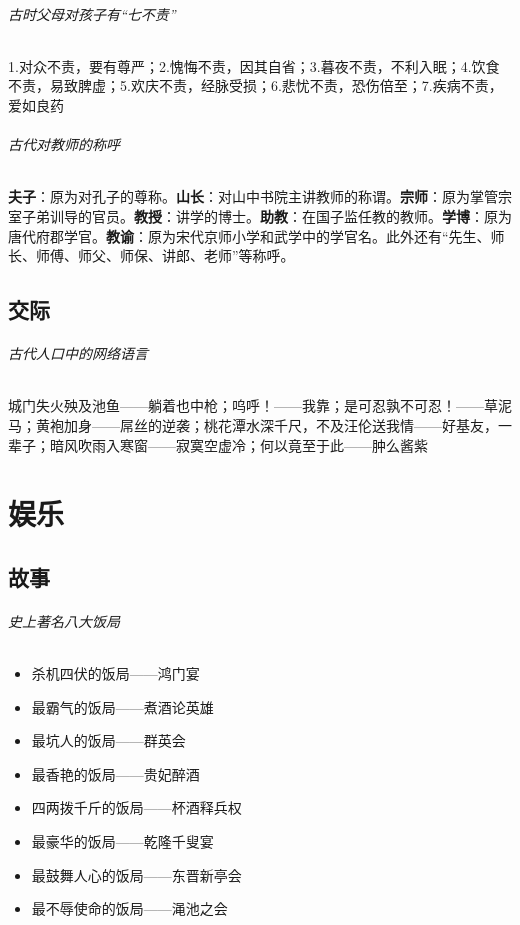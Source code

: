 \documentclass[UTF8,a4paper,12pt]{ctexbook}
\begin{document}
		\subparagraph{古时父母对孩子有“七不责”}1.对众不责，要有尊严；2.愧悔不责，因其自省；3.暮夜不责，不利入眠；4.饮食不责，易致脾虚；5.欢庆不责，经脉受损；6.悲忧不责，恐伤倍至；7.疾病不责，爱如良药 ​
		
		\subparagraph{古代对教师的称呼}​\textbf{夫子}：原为对孔子的尊称。\textbf{山长}：对山中书院主讲教师的称谓。\textbf{宗师}：原为掌管宗室子弟训导的官员。\textbf{教授}：讲学的博士。\textbf{助教}：在国子监任教的教师。\textbf{学博}：原为唐代府郡学官。\textbf{教谕}：原为宋代京师小学和武学中的学官名。此外还有“先生、师长、师傅、师父、师保、讲郎、老师”等称呼。​​
	\section{交际}
		\subparagraph{古代人口中的网络语言}城门失火殃及池鱼——躺着也中枪；呜呼！——我靠；是可忍孰不可忍！——草泥马；黄袍加身——屌丝的逆袭；桃花潭水深千尺，不及汪伦送我情——好基友，一辈子；暗风吹雨入寒窗——寂寞空虚冷；何以竟至于此——肿么酱紫
		
\chapter{娱乐}
	\section{故事}
		\subparagraph{史上著名八大饭局}	
			\begin{itemize}
				\item 杀机四伏的饭局——鸿门宴
				\item 最霸气的饭局——煮酒论英雄
				\item 最坑人的饭局——群英会
				\item 最香艳的饭局——贵妃醉酒
				\item 四两拨千斤的饭局——杯酒释兵权
				\item 最豪华的饭局——乾隆千叟宴
				\item 最鼓舞人心的饭局——东晋新亭会
				\item 最不辱使命的饭局——渑池之会 ​​​​
			\end{itemize}	    
\end{document}
